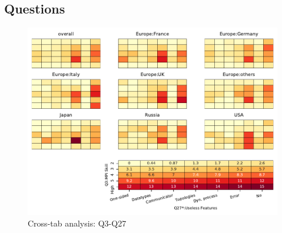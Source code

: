 
\subsection{Questions}


\begin{figure}
\begin{center}
\includegraphics[width=12cm]{../pdfs/Q3-Q27.pdf}
\caption{Cross-tab analysis: Q3-Q27}
\label{fig:Q3-Q27}
\end{center}
\end{figure}
